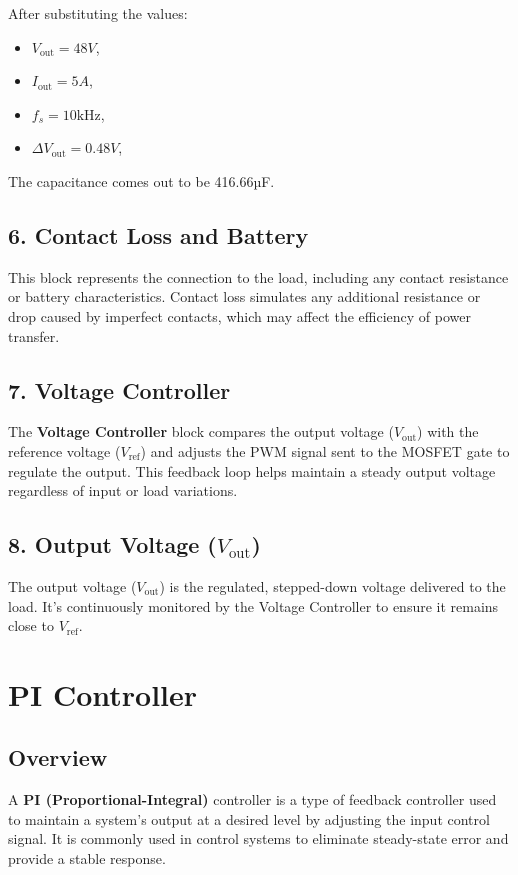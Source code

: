 \documentclass[12pt]{article}
\begin{document}
After substituting the values:
\begin{itemize}
    \item \(V_{\text{out}} = 48V\),
    \item \(I_{\text{out}} = 5A\),
    \item \(f_s = 10 \text{kHz}\),
    \item \(\Delta V_{\text{out}} = 0.48V\),
\end{itemize}

The capacitance comes out to be 416.66µF.

\subsection*{6. Contact Loss and Battery}
This block represents the connection to the load, including any contact resistance or battery characteristics. Contact loss simulates any additional resistance or drop caused by imperfect contacts, which may affect the efficiency of power transfer.

\subsection*{7. Voltage Controller}
The \textbf{Voltage Controller} block compares the output voltage (\(V_{\text{out}}\)) with the reference voltage (\(V_{\text{ref}}\)) and adjusts the PWM signal sent to the MOSFET gate to regulate the output. This feedback loop helps maintain a steady output voltage regardless of input or load variations.

\subsection*{8. Output Voltage (\(V_{\text{out}}\))}
The output voltage (\(V_{\text{out}}\)) is the regulated, stepped-down voltage delivered to the load. It’s continuously monitored by the Voltage Controller to ensure it remains close to \(V_{\text{ref}}\).

\section*{PI Controller}
\subsection*{Overview}
A \textbf{PI (Proportional-Integral)} controller is a type of feedback controller used to maintain a system’s output at a desired level by adjusting the input control signal. It is commonly used in control systems to eliminate steady-state error and provide a stable response.
\end{document}
